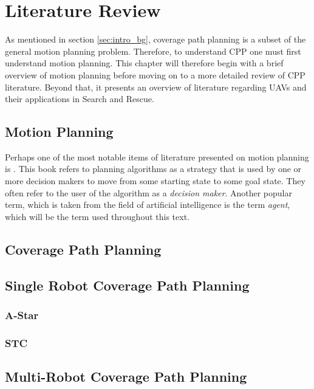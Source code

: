\chapter{Literature Review}
\label{chp:back}

As mentioned in section \ref{sec:intro_bg}, coverage path planning is a subset of the general motion planning problem. Therefore, to understand CPP one must first understand motion planning. This chapter will therefore begin with a brief overview of motion planning before moving on to a more detailed review of CPP literature. Beyond that, it presents an overview of literature regarding UAVs and their applications in Search and Rescue.
\section{Motion Planning}
Perhaps one of the most notable items of literature presented on motion planning is \cite{Lavalle2006}. This book refers to planning algorithms as a strategy that is used by one or more decision makers to move from some starting state to some goal state. They often refer to the user of  the algorithm as a \emph{decision maker}. Another popular term, which is taken from the field of artificial intelligence is the term \emph{agent}, which will be the  term used throughout this text.
\section{Coverage Path Planning}

\section{Single Robot Coverage Path Planning}
\subsection{A-Star}
\subsection{STC}
\section{Multi-Robot Coverage Path Planning}

